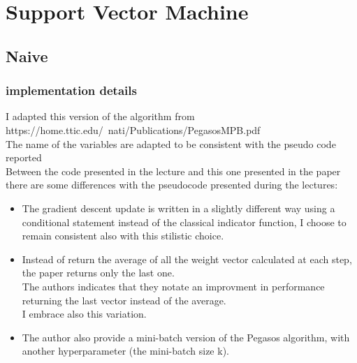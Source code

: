 \newpage
\section{Support Vector Machine}
\subsection{Naive}
\subsubsection{implementation details}
I adapted this version of the algorithm from https://home.ttic.edu/~nati/Publications/PegasosMPB.pdf\\
The name of the variables are adapted to be consistent with the pseudo code reported\\
Between the code presented in the lecture and this one presented in the paper there are some differences with the pseudocode presented during the lectures:\\
\begin{itemize}
    \item The gradient descent update is written in a slightly different way using a conditional statement instead of the classical indicator function, I choose to remain consistent also with this stilistic choice.\\
    \item Instead of return the average of all the weight vector calculated at each step, the paper returns only the last one.\\ 
    The authors indicates that they notate an improvment in performance returning the last vector instead of the average.\\ 
    I embrace also this variation.\\
    \item The author also provide a mini-batch version of the Pegasos algorithm, with another hyperparameter (the mini-batch size k).\\
\end{itemize}

